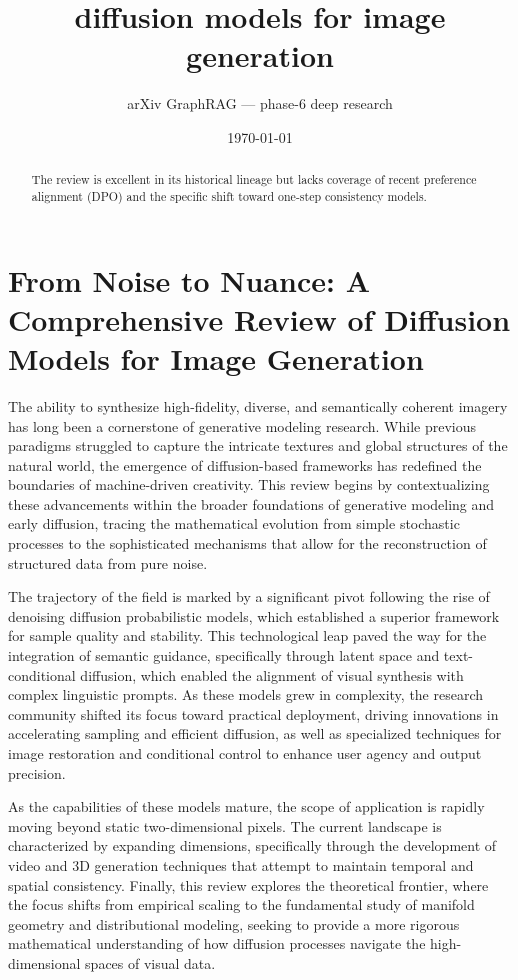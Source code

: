 \documentclass[11pt]{article}
\title{diffusion models for image generation}
\author{arXiv GraphRAG --- phase-6 deep research}
\date{\today}
\begin{document}
\maketitle

\begin{abstract}
The review is excellent in its historical lineage but lacks coverage of recent preference alignment (DPO) and the specific shift toward one-step consistency models.
\end{abstract}

\section{From Noise to Nuance: A Comprehensive Review of Diffusion Models for Image Generation}

The ability to synthesize high-fidelity, diverse, and semantically coherent imagery has long been a cornerstone of generative modeling research. While previous paradigms struggled to capture the intricate textures and global structures of the natural world, the emergence of diffusion-based frameworks has redefined the boundaries of machine-driven creativity. This review begins by contextualizing these advancements within the broader foundations of generative modeling and early diffusion, tracing the mathematical evolution from simple stochastic processes to the sophisticated mechanisms that allow for the reconstruction of structured data from pure noise.

The trajectory of the field is marked by a significant pivot following the rise of denoising diffusion probabilistic models, which established a superior framework for sample quality and stability. This technological leap paved the way for the integration of semantic guidance, specifically through latent space and text-conditional diffusion, which enabled the alignment of visual synthesis with complex linguistic prompts. As these models grew in complexity, the research community shifted its focus toward practical deployment, driving innovations in accelerating sampling and efficient diffusion, as well as specialized techniques for image restoration and conditional control to enhance user agency and output precision.

As the capabilities of these models mature, the scope of application is rapidly moving beyond static two-dimensional pixels. The current landscape is characterized by expanding dimensions, specifically through the development of video and 3D generation techniques that attempt to maintain temporal and spatial consistency. Finally, this review explores the theoretical frontier, where the focus shifts from empirical scaling to the fundamental study of manifold geometry and distributional modeling, seeking to provide a more rigorous mathematical understanding of how diffusion processes navigate the high-dimensional spaces of visual data.
\end{document}

